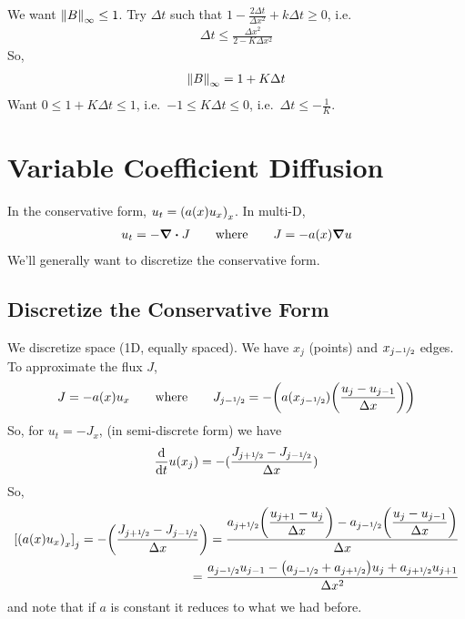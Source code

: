 \documentclass{article}
\newcommand{\half}{\nicefrac{1}{2}}
\newcommand{\Dx}{\Delta x}
\newcommand{\Dt}{\Delta t}
\begin{document}
            We want $\norm{B}_\infty \leq 1$.  Try $\Dt$ such that $1 - \frac{2\Dt}{\Dx^2} + k\Dt \geq 0$, i.e.
            \begin{align*}
                \Dt \leq \frac{\Dx^2}{2 - K\Dx^2}
            \end{align*}
            So,
            \begin{align*}
                \norm{B}_\infty = 1 + K\Dt
            \end{align*}
            Want $0 \leq 1 + K\Dt \leq 1$, i.e.~$-1 \leq K\Dt \leq 0$, i.e.~$\Dt \leq -\frac{1}{K}$.

    \section{Variable Coefficient Diffusion}

        In the conservative form, $u_t = \qty(a(x)u_x)_x$.  In multi-D,
        \begin{align*}
            u_t = -\div{J} \qquad \text{where} \qquad J = -a(x)\grad u
        \end{align*}
        We'll generally want to discretize the conservative form.

        \subsection{Discretize the Conservative Form}

            We discretize space (1D, equally spaced).  We have $x_j$ (points) and $x_{j-\half}$ edges.  To approximate the flux $J$,
            \begin{align*}
                 J = -a(x)u_x \qquad \text{where} \qquad J_{j-\half} = - \qty(a(x_{j-\half})\qty(\frac{u_{j} - u_{j-1}}{\Dx}))
            \end{align*}
            So, for $u_t = -J_x$, (in semi-discrete form) we have
            \begin{align*}
                \frac{\dd}{\dd t}u(x_j) = -(\frac{J_{j+\half} - J_{j-\half}}{\Dx})
            \end{align*}
            So,
            \begin{align*}
                \qty[\qty(a(x)u_x)_x]_j = -\qty(\frac{J_{j+\half} - J_{j-\half}}{\Dx}) = \frac{a_{j+\half}\qty(\dfrac{u_{j+1} - u_j}{\Dx}) - a_{j-\half}\qty(\dfrac{u_j - u_{j-1}}{\Dx})}{\Dx} \\
                = \frac{a_{j-\half}u_{j-1} - \qty(a_{j-\half} + a_{j+\half})u_j + a_{j+\half}u_{j+1}}{\Dx^2}
            \end{align*}
            and note that if $a$ is constant it reduces to what we had before.
\end{document}
